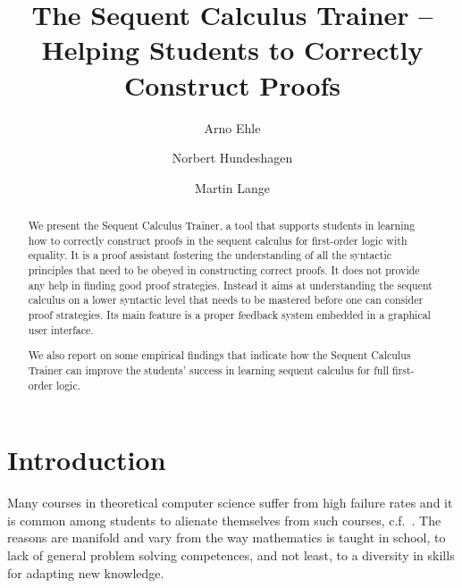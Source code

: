 \documentclass[a4paper,UKenglish]{lipics}
\begin{document}
 
\title{The Sequent Calculus Trainer -- Helping Students to Correctly Construct Proofs}

\author{Arno Ehle}
\author{Norbert Hundeshagen}
\author{Martin Lange}
\maketitle 








\begin{abstract}
We present the Sequent Calculus Trainer, a tool that supports students in learning how to correctly
construct proofs in the sequent calculus for first-order logic with equality. It is a proof assistant fostering
the understanding of all the syntactic principles that need to be obeyed in constructing correct proofs. It 
does not provide any help in finding good proof strategies. Instead it aims at understanding the sequent calculus
on a lower syntactic level that needs to be mastered before one can consider proof strategies. Its main feature is a proper
feedback system embedded in a graphical user interface.

We also report on some empirical findings that indicate how the Sequent Calculus Trainer can improve the students'
success in learning sequent calculus for full first-order logic.     
\end{abstract}


\section{Introduction}
Many courses in theoretical computer science suffer from high failure rates and it is common among students to alienate themselves from such courses,
c.f.\ \cite{Robins88,Surma:2012:RDT:2379703.2379716}. 
The reasons are manifold and vary from the way mathematics is taught in school, to lack of general problem solving competences, 
and not least, to a diversity in skills for adapting new knowledge.
\end{document}
